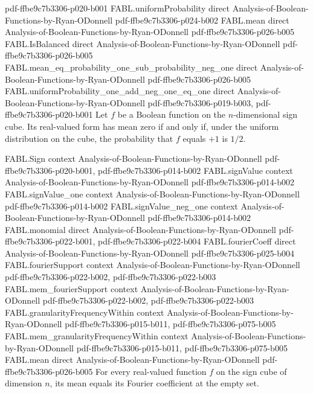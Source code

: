 \begin{theorem}
  {pdf-ffbe9c7b3306-p020-b001}
\proofstep
  {FABL.uniformProbability}
  {direct}
  {Analysis-of-Boolean-Functions-by-Ryan-ODonnell}
  {pdf-ffbe9c7b3306-p024-b002}
\proofstep
  {FABL.mean}
  {direct}
  {Analysis-of-Boolean-Functions-by-Ryan-ODonnell}
  {pdf-ffbe9c7b3306-p026-b005}
\proofstep
  {FABL.IsBalanced}
  {direct}
  {Analysis-of-Boolean-Functions-by-Ryan-ODonnell}
  {pdf-ffbe9c7b3306-p026-b005}
\proofstep
  {FABL.mean_eq_probability_one_sub_probability_neg_one}
  {direct}
  {Analysis-of-Boolean-Functions-by-Ryan-ODonnell}
  {pdf-ffbe9c7b3306-p026-b005}
\proofstep
  {FABL.uniformProbability_one_add_neg_one_eq_one}
  {direct}
  {Analysis-of-Boolean-Functions-by-Ryan-ODonnell}
  {pdf-ffbe9c7b3306-p019-b003,
    pdf-ffbe9c7b3306-p020-b001}
Let $f$ be a Boolean function on the $n$-dimensional sign cube. Its real-valued form has
mean zero if and only if, under the uniform distribution on the cube, the probability
that $f$ equals $+1$ is $1/2$.
\end{theorem}

\begin{theorem}
\label{FABL.mean_eq_fourierCoeff_empty}
\leanok
{}
\proofstep
  {FABL.Sign}
  {context}
  {Analysis-of-Boolean-Functions-by-Ryan-ODonnell}
  {pdf-ffbe9c7b3306-p020-b001,
    pdf-ffbe9c7b3306-p014-b002}
\proofstep
  {FABL.signValue}
  {context}
  {Analysis-of-Boolean-Functions-by-Ryan-ODonnell}
  {pdf-ffbe9c7b3306-p014-b002}
\proofstep
  {FABL.signValue_one}
  {context}
  {Analysis-of-Boolean-Functions-by-Ryan-ODonnell}
  {pdf-ffbe9c7b3306-p014-b002}
\proofstep
  {FABL.signValue_neg_one}
  {context}
  {Analysis-of-Boolean-Functions-by-Ryan-ODonnell}
  {pdf-ffbe9c7b3306-p014-b002}
\proofstep
  {FABL.monomial}
  {direct}
  {Analysis-of-Boolean-Functions-by-Ryan-ODonnell}
  {pdf-ffbe9c7b3306-p022-b001,
    pdf-ffbe9c7b3306-p022-b004}
\proofstep
  {FABL.fourierCoeff}
  {direct}
  {Analysis-of-Boolean-Functions-by-Ryan-ODonnell}
  {pdf-ffbe9c7b3306-p025-b004}
\proofstep
  {FABL.fourierSupport}
  {context}
  {Analysis-of-Boolean-Functions-by-Ryan-ODonnell}
  {pdf-ffbe9c7b3306-p022-b002,
    pdf-ffbe9c7b3306-p022-b003}
\proofstep
  {FABL.mem_fourierSupport}
  {context}
  {Analysis-of-Boolean-Functions-by-Ryan-ODonnell}
  {pdf-ffbe9c7b3306-p022-b002,
    pdf-ffbe9c7b3306-p022-b003}
\proofstep
  {FABL.granularityFrequencyWithin}
  {context}
  {Analysis-of-Boolean-Functions-by-Ryan-ODonnell}
  {pdf-ffbe9c7b3306-p015-b011,
    pdf-ffbe9c7b3306-p075-b005}
\proofstep
  {FABL.mem_granularityFrequencyWithin}
  {context}
  {Analysis-of-Boolean-Functions-by-Ryan-ODonnell}
  {pdf-ffbe9c7b3306-p015-b011,
    pdf-ffbe9c7b3306-p075-b005}
\proofstep
  {FABL.mean}
  {direct}
  {Analysis-of-Boolean-Functions-by-Ryan-ODonnell}
  {pdf-ffbe9c7b3306-p026-b005}
For every real-valued function $f$ on the sign cube of dimension $n$, its mean equals
its Fourier coefficient at the empty set.
\end{theorem}

